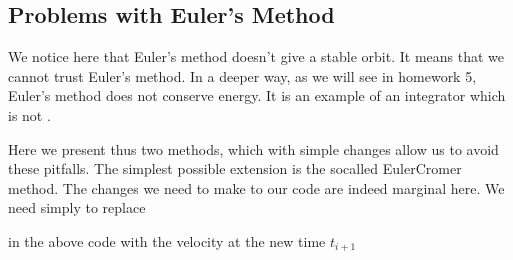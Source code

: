 \documentclass[letterpaper,10pt,english]{sphinxmanual}
\begin{document}
\begin{sphinxVerbatim}[commandchars=\\\{\}]
   
\PYG{p}{[}\PYG{p}{]} \PYG{p}{[}\PYG{p}{]}
\end{sphinxVerbatim}

\noindent{}


\subsection{Problems with Euler’s Method}
\label{\detokenize{chapter3:problems-with-euler-s-method}}
We notice here that Euler’s method doesn’t give a stable orbit. It
means that we cannot trust Euler’s method. In a deeper way, as we will
see in homework 5, Euler’s method does not conserve energy. It is an
example of an integrator which is not
.

Here we present thus two methods, which with simple changes allow us to avoid these pitfalls. The simplest possible extension is the so\sphinxhyphen{}called Euler\sphinxhyphen{}Cromer method.
The changes we need to make to our code are indeed marginal here.
We need simply to replace

\begin{sphinxVerbatim}[commandchars=\\\{\}]
    \PYG{p}{[}\PYG{p}{]}  \PYG{p}{[}\PYG{p}{]}  \PYG{p}{[}\PYG{p}{]}
\end{sphinxVerbatim}

in the above code with the velocity at the new time \(t_{i+1}\)

\begin{sphinxVerbatim}[commandchars=\\\{\}]
    \PYG{p}{[}\PYG{p}{]}  \PYG{p}{[}\PYG{p}{]}  \PYG{p}{[}\PYG{p}{]}
\end{sphinxVerbatim}
\end{document}
